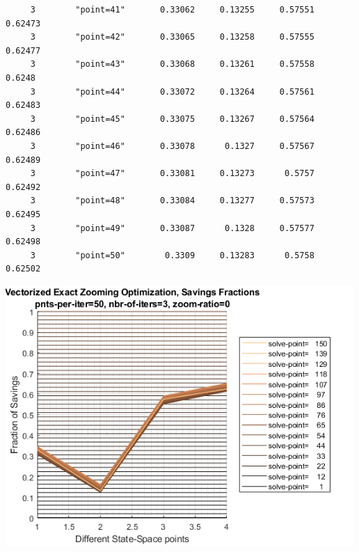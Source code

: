 \documentclass[
]{book}
\begin{document}
\begin{verbatim}
     3        "point=41"       0.33062     0.13255     0.57551     0.62473
     3        "point=42"       0.33065     0.13258     0.57555     0.62477
     3        "point=43"       0.33068     0.13261     0.57558      0.6248
     3        "point=44"       0.33072     0.13264     0.57561     0.62483
     3        "point=45"       0.33075     0.13267     0.57564     0.62486
     3        "point=46"       0.33078      0.1327     0.57567     0.62489
     3        "point=47"       0.33081     0.13273      0.5757     0.62492
     3        "point=48"       0.33084     0.13277     0.57573     0.62495
     3        "point=49"       0.33087      0.1328     0.57577     0.62498
     3        "point=50"        0.3309     0.13283      0.5758     0.62502
\end{verbatim}

\includegraphics[width=5.20833in,height=\textheight]{img/fx_optim_mzoom_savezrone_images/figure_0.png}
\end{document}
